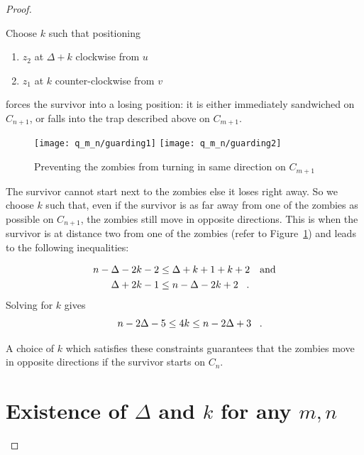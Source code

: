 \begin{proof}
\begin{proofpart}

  Choose $k$ such that positioning
  \begin{enumerate}
   \item $z_2$ at $\Delta + k$ clockwise from $u$
   \item $z_1$ at $k$ counter-clockwise from $v$
  \end{enumerate}
  forces the survivor into a losing position: it is either immediately sandwiched on $C_{n+1}$,
  or falls into the trap described above on $C_{m+1}$.

  \begin{figure}
    \centering
    \texttt{[image: q\_m\_n/guarding1]}
    \texttt{[image: q\_m\_n/guarding2]}
    \caption{Preventing the zombies from turning in same direction on $C_{m+1}$\label{fig:guarding}}
  \end{figure}

  The survivor cannot start next to the zombies else it loses right away.
  So we choose $k$ such that, even if the survivor is as far away from one of the zombies as possible on $C_{n+1}$, the zombies still move in opposite directions. This is when the survivor is at distance two from one of the zombies (refer to Figure~\ref{fig:guarding}) and leads to the following inequalities:

  \begin{align*}
   n - \Delta - 2k - 2 &\leq \Delta + k +1 + k +2 && \text{and} \\
   \Delta + 2k -1 &\leq n - \Delta -2k +2 \mperiod
  \end{align*}
  Solving for $k$ gives
  \[ n - 2\Delta -5 \leq 4k \leq n-2\Delta +3 \mperiod \]

  A choice of $k$ which satisfies these constraints guarantees that the zombies move in opposite directions if the survivor starts on $C_n$.

\end{proofpart}

\section{Existence of $\Delta$ and $k$ for any $m,n$ \label{thm q_m_n 3}}


\end{proof}
